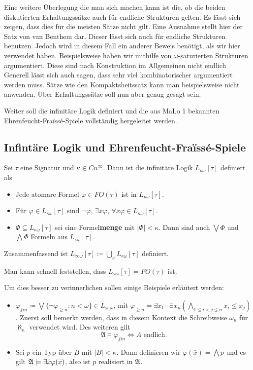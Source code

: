 Eine weitere Überlegung die man sich machen kann ist die, ob die beiden diskutierten Erhaltungssätze auch für endliche Strukturen gelten. Es lässt sich zeigen, dass dies für die meisten Sätze nicht gilt. Eine Ausnahme stellt hier der Satz von van Benthem dar. Dieser lässt sich auch für endliche Strukturen benutzen.
Jedoch wird in diesem Fall ein anderer Beweis benötigt, als wir hier verwendet haben. Beispielsweise haben wir mithilfe von $\omega$-saturierten Strukturen argumentiert. Diese sind nach Konstruktion im Allgemeinen nicht endlich
Generell lässt sich auch sagen, dass sehr viel kombinatorischer argumentiert werden muss. Sätze wie den Kompaktsheitssatz kann man beispielsweise nicht anwenden. Über Erhaltungssätze soll nun aber genug gesagt sein.

Weiter soll die infinitäre Logik definiert und die aus MaLo 1 bekannten Ehrenfeucht-Fra\"{i}ss\'{e}-Spiele vollständig hergeleitet werden.




\subsection{Infintäre Logik und Ehrenfeucht-Fra\"{i}ss\'{e}-Spiele}

\begin{definition}
	Sei $\tau$ eine Signatur und $\kappa\in Cn^\infty$. Dann ist die infinitäre Logik $L_{\kappa\omega}[\tau]$ definiert als
	\begin{itemize}
		\item Jede atomare Formel $\varphi\in FO(\tau)$ ist in $L_{\kappa\omega}[\tau]$.
		\item Für $\varphi\in L_{\kappa\omega}[\tau]$ sind $\neg\varphi$, $\exists x \varphi$, $\forall x \varphi\in L_{\kappa\omega}[\tau]$.
		\item $\Phi\subseteq L_{\kappa\omega}[\tau]$ sei eine Formel\textbf{menge} mit $\vert\Phi\vert<\kappa$. Dann sind auch $\bigvee\Phi$ und $\bigwedge \Phi$ Formeln aus $L_{\kappa\omega}[\tau]$.
	\end{itemize}
	Zusammenfassend ist $L_{\infty\omega}[\tau]\coloneqq\bigcup_\kappa L_{\kappa\omega}[\tau]$ definiert.
\end{definition}
Man kann schnell feststellen, dass $L_{\omega\omega}[\tau]=FO(\tau)$ ist.

Um dies besser zu verinnerlichen sollen einige Beispiele erläutert werden:
\begin{itemize}
	\item $\varphi_{fin}\coloneqq\bigvee \{\neg\varphi_{\geq n}: n< \omega\} \in L_{\omega_1\omega}$, mit $\varphi_{\geq n}=\exists x_1\cdots \exists x_n(\bigwedge_{1\leq i < j \leq n}x_i\leq x_j)$. 
	Zuerst soll bemerkt werden, dass in diesem Kontext die Schreibweise $\omega_n$ für $\aleph_n$ verwendet wird. Des weiteren gilt
	$$\mathfrak{A}\models\varphi_{fin} \Leftrightarrow A \text{ endlich}.$$
	
	\item Sei $p$ ein Typ über $B$ mit $\vert B\vert<\kappa$. Dann definieren wir $\varphi(\bar{x})=\bigwedge p$ und es gilt $\mathfrak{A}\models \exists \bar{x} \varphi(\bar{x})$, also ist $p$ realisiert in $\mathfrak{A}$.
\end{itemize}

